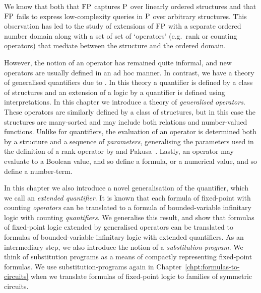\documentclass[../main/thesis.tex]{subfiles}
\begin{document}
We know that both that $\text{\upshape FP}$ captures $\mathrm{P}$ over linearly ordered structures and
that $\text{\upshape FP}$ fails to express low-complexity queries in $\mathrm{P}$ over arbitrary
structures. This observation has led to the study of extensions of $\text{\upshape FP}$ with a
separate ordered number domain along with a set of set of `operators' (e.g.\
rank or counting operators) that mediate between the structure and the ordered
domain.

However, the notion of an operator has remained quite informal, and new
operators are usually defined in an ad hoc manner. In contrast, we have a theory
of generalised quantifiers due to {\lindstrom}. In this theory a quantifier is
defined by a class of structures and an extension of a logic by a quantifier is
defined using interpretations. In this chapter we introduce a theory of
\emph{generalised operators}. These operators are similarly defined by a class
of structures, but in this case the structures are many-sorted and may include
both relations and number-valued functions. Unlike for quantifiers, the
evaluation of an operator is determined both by a structure and a sequence of
\emph{parameters}, generalising the parameters used in the definition of a rank
operator by {\gradel} and Pakusa~\cite{GradelP15a}. Lastly, an operator may
evaluate to a Boolean value, and so define a formula, or a numerical value, and
so define a number-term.

In this chapter we also introduce a novel generalisation of the {\lindstrom}
quantifier, which we call an \emph{extended quantifier}. It is known that each formula
of fixed-point with counting \emph{operators} can be translated to a formula of
bounded-variable infinitary logic with counting \emph{quantifiers}. We
generalise this result, and show that formulas of fixed-point logic extended by
generalised operators can be translated to formulas of bounded-variable
infinitary logic with extended quantifiers. As an intermediary step, we also
introduce the notion of a \emph{substitution-program}. We think of substitution
programs as a means of compactly representing fixed-point formulas. We use
substitution-programs again in Chapter~\ref{chpt:formulas-to-circuits} when we
translate formulas of fixed-point logic to families of symmetric circuits.
\end{document}
